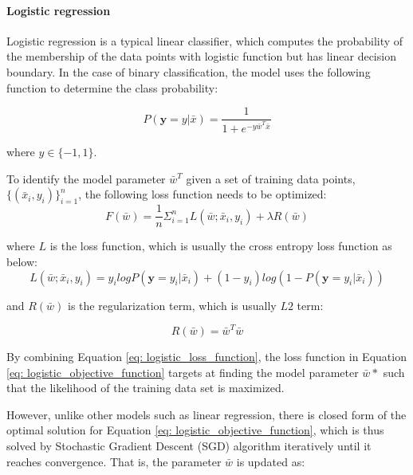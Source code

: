 \paragraph{Logistic regression}
Logistic regression is a typical linear classifier, which computes the probability of the membership of the data points with logistic function but has linear decision boundary. In the case of binary classification, the model uses the following function to determine the class probability:

\begin{equation}\label{eq: logistic_regression_prob}
    P(\textbf{y}=y|\bar{x}) = \frac{1}{1+e^{-y\bar{w}^T\bar{x}}}
\end{equation}

where $y \in \{-1,1\}$.

To identify the model parameter $\bar{w}^T$ given a set of training data points, $\{(\bar{x}_i, y_i)\}_{i=1}^n$, the following loss function needs to be optimized:
\begin{equation}\label{eq: logistic_objective_function}
    F(\bar{w}) = \frac{1}{n}\Sigma_{i=1}^nL(\bar{w};\bar{x}_i, y_i) + \lambda R(\bar{w})
\end{equation}

where $L$ is the loss function, which is usually the cross entropy loss function as below:
\begin{equation}\label{eq: logistic_loss_function}
    L(\bar{w}; \bar{x}_i, y_i) = y_ilogP(\textbf{y}=y_i|\bar{x}_i) + (1-y_i)log(1-P(\textbf{y}=y_i|\bar{x}_i))
\end{equation}

and $R(\bar{w})$ is the regularization term, which is usually $L2$ term:

\begin{equation}
    R(\bar{w}) = \bar{w}^T\bar{w}
\end{equation}


By combining Equation \ref{eq: logistic_loss_function}, the loss function in Equation \ref{eq: logistic_objective_function} targets at finding the model parameter $\bar{w}*$ such that the likelihood of the training data set is maximized. 

However, unlike other models such as linear regression, there is closed form of the optimal solution for Equation \ref{eq: logistic_objective_function}, which is thus solved by Stochastic Gradient Descent (SGD) algorithm \cite{robert2014machine} iteratively until it reaches convergence. That is, the parameter $\bar{w}$ is updated as:

